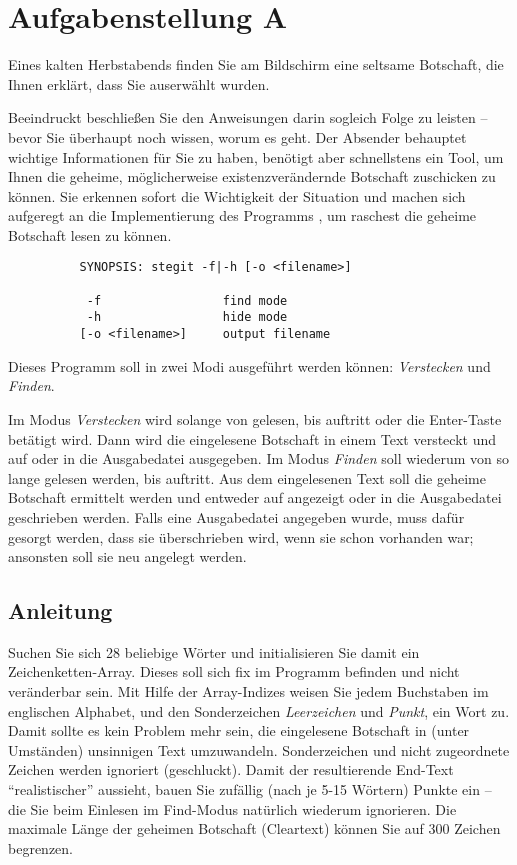 




\section*{Aufgabenstellung A}

Eines kalten Herbstabends finden Sie am Bildschirm eine seltsame Botschaft, die
Ihnen erklärt, dass Sie auserwählt wurden.

Beeindruckt beschließen Sie den Anweisungen darin sogleich Folge zu leisten --
bevor Sie überhaupt noch wissen, worum es geht. Der Absender behauptet wichtige
Informationen für Sie zu haben, benötigt aber schnellstens ein Tool, um Ihnen
die geheime, möglicherweise existenzverändernde Botschaft zuschicken zu können.
Sie erkennen sofort die Wichtigkeit der Situation und machen sich aufgeregt an
die Implementierung des Programms , um raschest die geheime
Botschaft lesen zu können.

\begin{verbatim}
          SYNOPSIS: stegit -f|-h [-o <filename>]

           -f                 find mode
           -h                 hide mode
          [-o <filename>]     output filename
\end{verbatim}

Dieses Programm soll in zwei Modi ausgeführt werden können: \emph{Verstecken}
und \emph{Finden}.

Im Modus \emph{Verstecken} wird solange von  gelesen, bis
 auftritt oder die Enter-Taste betätigt wird. Dann wird die
eingelesene Botschaft in einem Text versteckt und auf 
oder in die Ausgabedatei ausgegeben. Im Modus \emph{Finden} soll wiederum von
 so lange gelesen werden, bis  auftritt.
Aus dem eingelesenen Text soll die geheime Botschaft ermittelt werden und
entweder auf  angezeigt oder in die Ausgabedatei
geschrieben werden. Falls eine Ausgabedatei angegeben wurde, muss dafür gesorgt
werden, dass sie überschrieben wird, wenn sie schon vorhanden war; ansonsten
soll sie neu angelegt werden.

\subsection*{Anleitung}
Suchen Sie sich 28 beliebige Wörter und initialisieren Sie damit ein
Zeichenketten-Array. Dieses soll sich fix im Programm befinden und nicht
veränderbar sein. Mit Hilfe der Array-Indizes weisen Sie jedem Buchstaben im
englischen Alphabet, und den Sonderzeichen \emph{Leerzeichen} und \emph{Punkt},
ein Wort zu. Damit sollte es kein Problem mehr sein, die eingelesene Botschaft
in (unter Umständen) unsinnigen Text umzuwandeln. Sonderzeichen und nicht
zugeordnete Zeichen werden ignoriert (geschluckt). Damit der resultierende
End-Text "`realistischer"' aussieht, bauen Sie zufällig (nach je 5-15 Wörtern)
Punkte ein -- die Sie beim Einlesen im Find-Modus natürlich wiederum ignorieren.
Die maximale Länge der geheimen Botschaft (Cleartext) können Sie auf 300 Zeichen
begrenzen.

